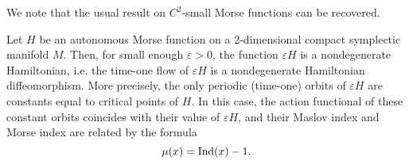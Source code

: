 We note that the usual result on $C^2$-small Morse functions can be recovered.

\begin{corollary}
Let $H$ be an autonomous Morse function on a 2-dimensional compact symplectic manifold $M$. Then, for small enough $\varepsilon > 0$, the function $\varepsilon H$ is a nondegenerate Hamiltonian, i.e. the time-one flow of $\varepsilon H$ is a nondegenerate Hamiltonian diffeomorphism. More precisely, the only periodic (time-one) orbits of $\varepsilon H$ are constants equal to critical points of $H$. In this case, the action functional of these constant orbits coincides with their value of $\varepsilon H$, and their Maslov index and Morse index are related by the formula
\begin{equation}
\mu(x) = \operatorname{Ind}(x) - 1.
\end{equation}
\end{corollary}

